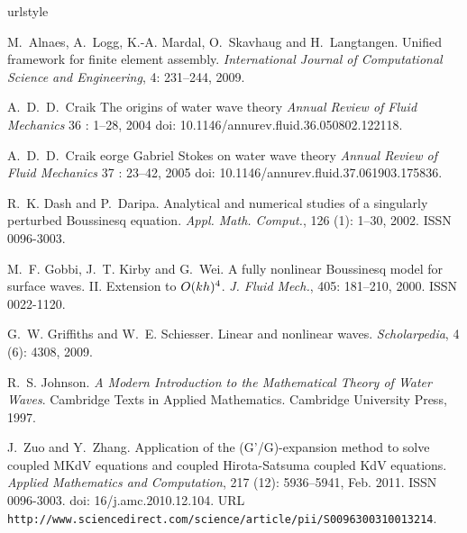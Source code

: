 \begin{thebibliography}{88}
\providecommand{\url}[1]{\texttt{#1}}
\expandafter\ifx\csname urlstyle\endcsname\relax
  \providecommand{\doi}[1]{doi: #1}\else
  \providecommand{\doi}{doi: \begingroup \urlstyle{rm}\Url}\fi


M.~Alnaes, A.~Logg, K.-A. Mardal, O.~Skavhaug and H.~Langtangen.
\newblock Unified framework for finite element assembly.
\newblock \emph{International Journal of Computational Science and
  Engineering}, 4: 231--244, 2009.



A.~D.~D.~Craik
\newblock The origins of water wave theory
\newblock \emph{Annual Review of Fluid Mechanics} 36 : 1--28, 2004
\newblock \doi{10.1146/annurev.fluid.36.050802.122118}.

A.~D.~D.~Craik
eorge {G}abriel {S}tokes on water wave theory
\newblock \emph{Annual Review of Fluid Mechanics} 37 : 23--42, 2005
\newblock \doi{10.1146/annurev.fluid.37.061903.175836}.


R.~K. Dash and P.~Daripa.
\newblock Analytical and numerical studies of a singularly perturbed
  {B}oussinesq equation.
\newblock \emph{Appl. Math. Comput.}, 126 (1): 1--30, 2002.
\newblock ISSN 0096-3003.


M.~F. Gobbi, J.~T. Kirby and G.~Wei.
\newblock A fully nonlinear {B}oussinesq model for surface waves. {II}.
  {E}xtension to {$O(kh)\sp 4$}.
\newblock \emph{J. Fluid Mech.}, 405: 181--210, 2000.
\newblock ISSN 0022-1120.

G.~W. Griffiths and W.~E. Schiesser.
\newblock Linear and nonlinear waves.
\newblock \emph{Scholarpedia}, 4 (6): 4308, 2009.



R.~S. Johnson.
\newblock \emph{A Modern Introduction to the Mathematical Theory of Water
  Waves}.
\newblock Cambridge Texts in Applied Mathematics. Cambridge University Press,
  1997.


J.~Zuo and Y.~Zhang.
\newblock Application of the ({G}'/{G})-expansion method to solve coupled
  {MKdV} equations and coupled {Hirota-Satsuma} coupled {KdV} equations.
\newblock \emph{Applied Mathematics and Computation}, 217
  (12): 5936--5941, Feb. 2011.
\newblock ISSN 0096-3003.
\newblock \doi{16/j.amc.2010.12.104}.
\newblock URL
  \url{http://www.sciencedirect.com/science/article/pii/S0096300310013214}.
\end{thebibliography}
